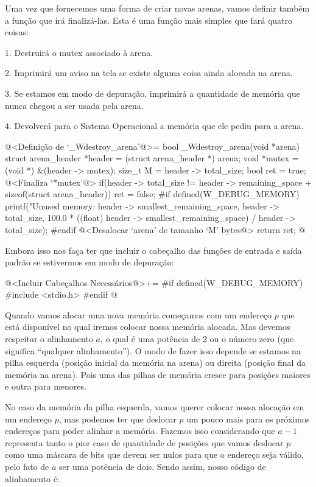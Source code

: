 Uma vez que fornecemos uma forma de criar novas arenas, vamos definir
também a função que irá finalizá-las. Esta é uma função mais simples
que fará quatro coisas:

1. Destruirá o mutex associado à arena.

2. Imprimirá um aviso na tela se existe alguma coisa ainda alocada na
arena.

3. Se estamos em modo de depuração, imprimirá a quantidade de memória
que nunca chegou a ser usada pela arena.

4. Devolverá para o Sistema Operacional a memória que ele pediu para a
arena.

\iniciocodigo
@<Definição de `\_Wdestroy\_arena'@>=
bool _Wdestroy_arena(void *arena){
  struct arena_header *header = (struct arena_header *) arena;
  void *mutex = (void *) &(header -> mutex);
  size_t M = header -> total_size;
  bool ret = true;
  @<Finaliza `*mutex'@>
  if(header -> total_size != header -> remaining_space +
     sizeof(struct arena_header))
    ret = false;
#if defined(W_DEBUG_MEMORY)
  printf("Unused memory: %
         header -> smallest_remaining_space, header -> total_size,
         100.0 *
         ((float) header -> smallest_remaining_space) / header -> total_size);
#endif
  @<Desalocar `arena' de tamanho `M' bytes@>
  return ret;
}
@
\fimcodigo

Embora isso nos faça ter que incluir o cabeçalho das funções de
entrada e saída padrão se estivermos em modo de depuração:

\iniciocodigo
@<Incluir Cabeçalhos Necessários@>+=
#if defined(W_DEBUG_MEMORY)
#include <stdio.h>
#endif
@
\fimcodigo


Quando vamos alocar uma nova memória começamos com um endereço $p$ que
está disponível no qual iremos colocar nossa memória alocada. Mas
devemos respeitar o alinhamento $a$, o qual é uma potência de 2 ou o
número zero (que significa ``qualquer alinhamento''). O modo de fazer
isso depende se estamos na pilha esquerda (posição inicial da memória
na arena) ou direita (posição final da memória na arena). Pois uma das
pilhas de memória cresce para posições maiores e outra para menores.

No caso da memória da pilha esquerda, vamos querer colocar nossa
alocação em um endereço $p$, mas podemos ter que deslocar $p$ um pouco
mais para os próximos endereços para poder alinhar a memória. Fazemos
isso considerando que $a-1$ representa tanto o pior caso de quantidade de
posições que vamos deslocar $p$ como uma máscara de bits que devem ser
nulos para que o endereço seja válido, pelo fato de $a$ ser uma potência de
dois. Sendo assim, nosso código de alinhamento é:

